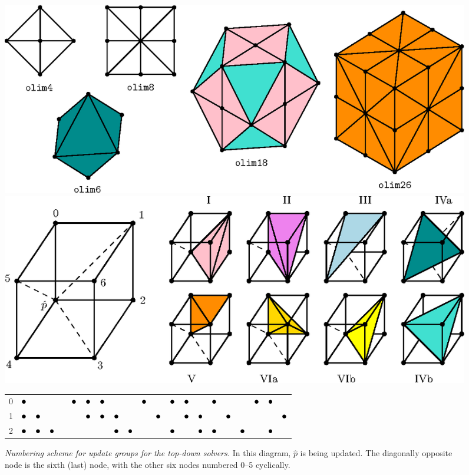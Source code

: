 \documentclass{article}
\begin{document}
\begin{figure}
  \centering
  \includegraphics[width=0.95\linewidth]{neighborhoods.eps}
  \caption{\emph{Neighborhoods for the top-down family of algorithms.}
    Algorithms \texttt{olim4} and \texttt{olim8} are 2D solvers and
    the rest are 3D solvers. The color coding of tetrahedron updates
    is the same for this figure and \cref{fig:octant-numbering}
    below.}\label{fig:neighborhoods}%
  \includegraphics[width=0.95\linewidth]{simplex-groups.eps}
  \caption{\emph{Numbering scheme for update groups for the top-down solvers.} In this
    diagram, $\hat{p}$ is being updated. The diagonally opposite node
    is the sixth (last) node, with the other six nodes numbered 0--5
    cyclically.}\label{fig:octant-numbering}
  { \footnotesize
    \begin{tabular}{c|cccccc|cccccc|cccccc|cc}
      0 & $\groupmarker$ & & & & $\groupmarker$ & $\groupmarker$ & $\groupmarker$ & & & $\groupmarker$ & & $\groupmarker$ & $\groupmarker$ & & $\groupmarker$ & & & $\groupmarker$ & $\groupmarker$ & \\
      1 & $\groupmarker$ & $\groupmarker$ & & & & $\groupmarker$ & $\groupmarker$ & $\groupmarker$ & & & $\groupmarker$ & & $\groupmarker$ & $\groupmarker$ & & $\groupmarker$ & & & & $\groupmarker$ \\
      2 & $\groupmarker$ & $\groupmarker$ & $\groupmarker$ & & & & & $\groupmarker$ & $\groupmarker$ & & & $\groupmarker$ & & $\groupmarker$ & $\groupmarker$ & & $\groupmarker$ & & $\groupmarker$ & \\

\end{tabular}}
\end{figure}
\end{document}
